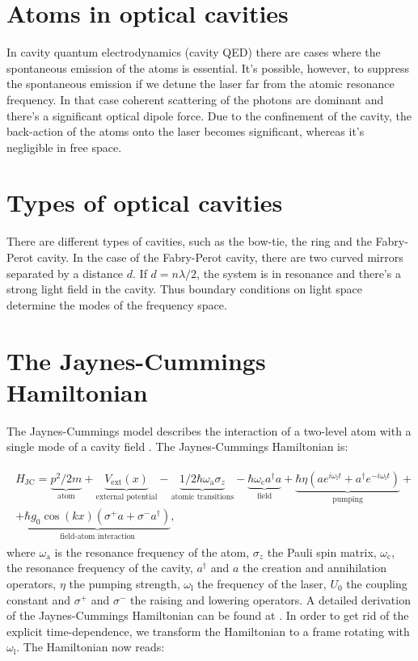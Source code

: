 \section{Atoms in optical cavities}

In cavity quantum electrodynamics (cavity QED) there are cases where the spontaneous emission of the atoms is essential. It's possible, however, to suppress the spontaneous emission if we detune the laser far from the atomic resonance frequency. In that case coherent scattering of the photons are dominant and there's a significant optical dipole force. Due to the confinement of the cavity, the back-action of the atoms onto the laser becomes significant, whereas it's negligible in free space.

\section{Types of optical cavities}
There are different types of cavities, such as the bow-tie, the ring and the Fabry-Perot cavity. In the case of the Fabry-Perot cavity, there are two curved mirrors separated by a distance $d$. If $d = n \lambda / 2$, the system is in resonance and there's a strong light field in the cavity. Thus boundary conditions on light space determine the modes of the frequency space.

\section{The Jaynes-Cummings Hamiltonian}
The Jaynes-Cummings model describes the interaction of a two-level atom with a single mode of a cavity field \cite{jaynes}. The Jaynes-Cummings Hamiltonian is:

\begin{align}
\begin{split}
H_\text{JC} = \underbrace{p^2 / 2m}_\text{atom} + \underbrace{V_\text{ext}(x)}_\text{external potential} - \underbrace{1/2 \hbar \omega_\text{a} \sigma_z}_\text{atomic transitions} - \underbrace{\hbar \omega_\text{c} a^\dagger a}_\text{field} + \underbrace{\hbar \eta (a e^{i \omega_\text{l} t} + a^\dagger e^{-i \omega_\text{l} t})}_\text{pumping} + \\
+ \underbrace{\hbar g_0 \cos(kx) (\sigma^+ a + \sigma^- a^\dagger)}_\text{field-atom interaction},
\end{split}
\end{align}where $\omega_\text{a}$ is the resonance frequency of the atom, $\sigma_z$ the Pauli spin matrix, $\omega_\text{c}$, the resonance frequency of the cavity, $a^\dagger$ and $a$ the creation and annihilation operators, $\eta$ the pumping strength, $\omega_\text{l}$ the frequency of the laser, $U_0$ the coupling constant and $\sigma^+$ and $\sigma^-$ the raising and lowering operators. A detailed derivation of the Jaynes-Cummings Hamiltonian can be found at \cite{collapseandrevival}. In order to get rid of the explicit time-dependence, we transform the Hamiltonian to a frame rotating with $\omega_\text{l}$. The Hamiltonian now reads:

